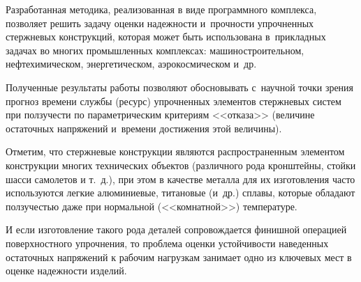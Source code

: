 Разработанная методика, реализованная в виде программного комплекса, позволяет решить задачу оценки надежности и~прочности упрочненных стержневых конструкций, которая может быть использована в~прикладных задачах во многих промышленных комплексах: машиностроительном, нефтехимическом, энергетическом, аэрокосмическом и~др. 

Полученные результаты работы позволяют  обосновывать с~научной точки зрения прогноз времени службы (ресурс) упрочненных элементов стержневых систем при ползучести по параметрическим критериям <<отказа>> (величине остаточных напряжений и~времени достижения этой величины).



Отметим, что стержневые конструкции являются распространенным элементом конструкции многих технических объектов (различного рода кронштейны, стойки шасси самолетов и т.~д.), при этом в качестве металла для их изготовления часто используются легкие алюминиевые, титановые (и~др.) сплавы, которые обладают ползучестью даже при нормальной (<<комнатной>>) температуре.

И если изготовление такого рода деталей сопровождается финишной операцией поверхностного упрочнения, то проблема оценки устойчивости наведенных остаточных напряжений к рабочим нагрузкам занимает одно из ключевых мест в оценке надежности изделий.















